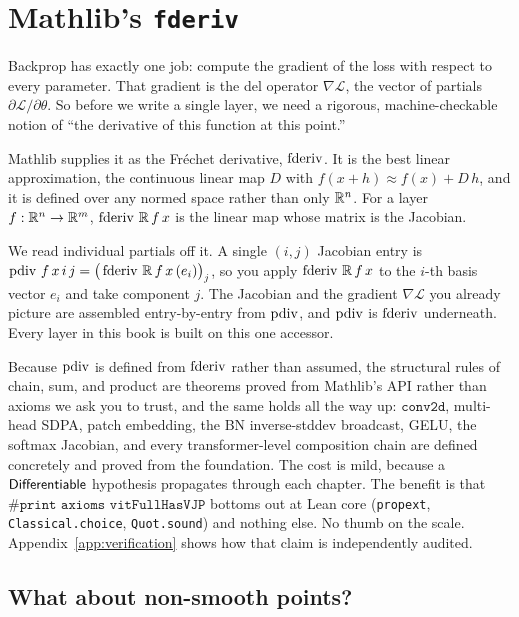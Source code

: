 \section*{Mathlib's \texttt{fderiv}}

Backprop has exactly one job: compute the gradient of the loss with
respect to every parameter. That gradient is the del operator
\(\nabla\mathcal{L}\), the vector of partials
\(\partial\mathcal{L}/\partial\theta\). So before we write a single
layer, we need a rigorous, machine-checkable notion of ``the derivative
of this function at this point.''

Mathlib supplies it as the Fréchet derivative, \(\operatorname{fderiv}\). It is the
best linear approximation, the continuous linear map \(D\) with
\(f(x+h) \approx f(x) + D\,h\), and it is defined over any normed space
rather than only \(\mathbb{R}^n\). For a layer \(f : \mathbb{R}^{n} \to \mathbb{R}^{m}\),
\(\operatorname{fderiv}\,\mathbb{R}\,f\,x\) is the linear map whose matrix is the Jacobian.

We read individual partials off it. A single \((i,j)\) Jacobian entry is
\(\operatorname{pdiv}\,f\,x\,i\,j = \big(\operatorname{fderiv}\,\mathbb{R}\,f\,x\,(e_i)\big)_j\), so you
apply \(\operatorname{fderiv}\,\mathbb{R}\,f\,x\) to the \(i\)-th basis vector \(e_i\) and take
component \(j\). The Jacobian and the gradient \(\nabla\mathcal{L}\)
you already picture are assembled entry-by-entry from \(\operatorname{pdiv}\), and
\(\operatorname{pdiv}\) is \(\operatorname{fderiv}\) underneath. Every layer in this book is built on
this one accessor.

Because \(\operatorname{pdiv}\) is defined from \(\operatorname{fderiv}\) rather than assumed, the
structural rules of chain, sum, and product are theorems proved from
Mathlib's API rather than axioms we ask you to trust, and the same holds
all the way up: \(\texttt{conv2d}\), multi-head SDPA, patch embedding,
the BN inverse-stddev broadcast, GELU, the softmax Jacobian, and every
transformer-level composition chain are defined concretely and proved
from the foundation. The cost is mild, because a
\(\mathsf{Differentiable}\) hypothesis propagates through each chapter. The
benefit is that \(\texttt{\#print axioms vitFullHasVJP}\) bottoms
out at Lean core (\texttt{propext}, \texttt{Classical.choice},
\texttt{Quot.sound}) and nothing else. No thumb on the scale.
Appendix~\ref{app:verification} shows how that claim is independently
audited.

\subsection*{What about non-smooth points?}

